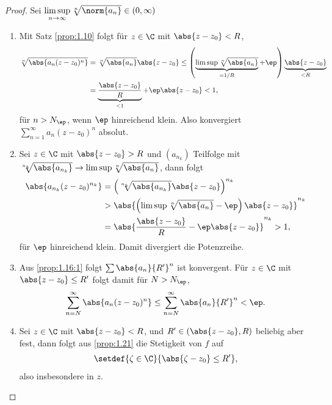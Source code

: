 \begin{proof}
Sei $\limsup\limits_{n\to\infty}
\sqrt[n]{\norm{a_n}} \in (0,\infty)$
\begin{enumerate}[label=(\roman{*})]
  \item Mit Satz \ref{prop:1.10} folgt für $z\in\C$ mit $\abs{z-z_0}<R$,
  \begin{align*}
  \sqrt[n]{\abs{a_n(z-z_0)^n}} &= \sqrt[n]{\abs{a_n}}\abs{z-z_0} \le \left(
  \underbrace{\limsup \sqrt[n]{\abs{a_n}}}_{=1/R} + \ep
  \right)\underbrace{\abs{z-z_0}}_{< R} \\ &=
  \underbrace{\frac{\abs{z-z_0}}{R}}_{<1} + \ep\abs{z-z_0} < 1,
  \end{align*}
für $n > N_\ep$, wenn $\ep$ hinreichend klein. Also konvergiert
$\sum\limits_{n=1}^\infty a_n(z-z_0)^n$ absolut.
  \item Sei $z\in\C$ mit $\abs{z-z_0}>R$ und $(a_{n_k})$ Teilfolge mit
  $\sqrt[n_k]{\abs{a_{n_k}}} \to \limsup \sqrt[n]{\abs{a_n}}$, dann folgt
  \begin{align*}
  \abs{a_{n_k}(z-z_0)^{n_k}} &=
  \left(\sqrt[n_k]{\abs{a_{n_k}}}\abs{z-z_0}\right)^{n_k} \\
  &>   \abs{\left(
  \limsup \sqrt[n]{\abs{a_n}} - \ep\right)\abs{z-z_0}}^{n_k} \\ &= \abs{\frac{\abs{z-z_0}}{R} - \ep\abs{z-z_0}}^{n_k} > 1,
  \end{align*}
für $\ep$ hinreichend klein. Damit divergiert die Potenzreihe.
  \item Aus \ref{prop:1.16:1} folgt $\sum\abs{a_n} {R'}^n$ ist konvergent. 
  Für $z\in\C$ mit $\abs{z-z_0} \le R'$ folgt damit für $N>N_\ep$,
  \begin{align*}
  \sum\limits_{n=N}^\infty \abs{a_n(z-z_0)^n} \le \sum\limits_{n=N}^\infty
  \abs{a_n}{R'}^n < \ep.
  \end{align*}
  \item 
  Sei $z\in\C$ mit $\abs{z-z_0}<R$, und $R'\in(\abs{z-z_0},R)$ beliebig aber
  fest, dann folgt aus \ref{prop:1.21} die Stetigkeit von $f$ auf
  \begin{align*}
  \setdef{\zeta\in\C}{\abs{\zeta-z_0} \le R'},
  \end{align*}
  also insbesondere in $z$.\qedhere
\end{enumerate}
\end{proof}

